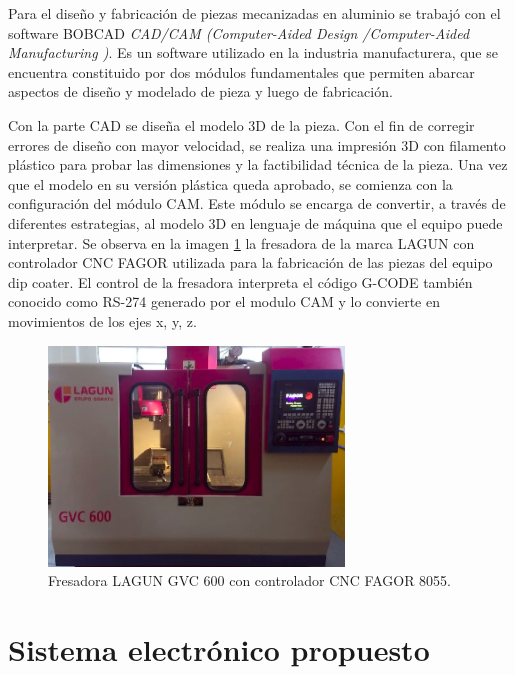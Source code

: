Para el diseño y fabricación de piezas mecanizadas en aluminio se trabajó con el software BOBCAD \citep{web_bobcad} \textit{CAD/CAM (Computer-Aided Design /Computer-Aided Manufacturing )}. Es un software  utilizado en la industria manufacturera, que se encuentra constituido por dos módulos fundamentales que permiten abarcar aspectos de diseño y modelado de pieza y luego de fabricación.  

Con la parte CAD se diseña el modelo 3D de la pieza. Con el fin de corregir errores de diseño con mayor velocidad, se realiza una impresión 3D con filamento plástico para probar las dimensiones y la factibilidad técnica de la pieza.
Una vez que el modelo en su versión plástica queda aprobado, se comienza con la configuración del módulo CAM. Este módulo se encarga de convertir, a través de diferentes estrategias, al modelo 3D en lenguaje de máquina que el equipo puede interpretar. Se observa en la imagen \ref{fig:fagor} la fresadora de la marca LAGUN con controlador CNC FAGOR \citep{web_fagor} utilizada para la fabricación de las piezas del equipo dip coater. El control de la fresadora interpreta el código G-CODE también conocido como RS-274 \citep{web_gcode} generado por el modulo CAM y lo convierte en movimientos de los ejes x, y, z.


\begin{figure}[ht]
\centering 
\includegraphics[width=0.7\textwidth]{./Figures/fagor.png}
\caption{Fresadora LAGUN GVC 600 con controlador CNC FAGOR 8055\protect\footnotemark.}
\label{fig:fagor}
\end{figure}
 

\section{Sistema electrónico propuesto}
\label{sec:sistema_propuesto}



